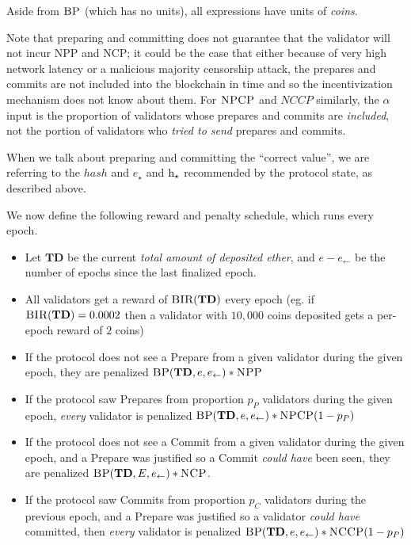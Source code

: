 \documentclass[12pt, final]{article}
\newcommand{\epoch}{\ensuremath{e}}
\newcommand{\hash}{\textnormal{h}}
\newcommand{\hashsource}{\hash_{\star}\xspace}
\newcommand{\epochsource}{\epoch_{\star}\xspace}
\newcommand{\BIR}{\textsc{BIR}\xspace}
\newcommand{\BP}{\textsc{BP}\xspace}
\newcommand{\NCP}{\textsc{NCP}\xspace}
\newcommand{\NCCP}{\textsc{NCCP}\xspace}
\newcommand{\NPP}{\textsc{NPP}\xspace}
\newcommand{\NPCP}{\textsc{NPCP}\xspace}
\newcommand{\totaldeposit}{ \textbf{TD} \xspace}
\newcommand{\LFE}{ \ensuremath{\epoch_{\leftarrow}} \xspace}
\begin{document}
Aside from $\BP$ (which has no units), all expressions have units of \emph{coins}.

Note that preparing and committing does not guarantee that the validator will not incur \NPP and \NCP; it could be the case that either because of very high network latency or a malicious majority censorship attack, the prepares and commits are not included into the blockchain in time and so the incentivization mechanism does not know about them. For $\NPCP$ and $NCCP$ similarly, the $\alpha$ input is the proportion of validators whose prepares and commits are \emph{included}, not the portion of validators who \emph{tried to send} prepares and commits. 

When we talk about preparing and committing the ``correct value'', we are referring to the $hash$ and $\epochsource$ and $\hashsource$ recommended by the protocol state, as described above.

We now define the following reward and penalty schedule, which runs every epoch.

\begin{itemize}
\item Let $\totaldeposit$ be the current \emph{total amount of deposited ether}, and $\epoch - \LFE$ be the number of epochs since the last finalized epoch.
\item All validators get a reward of $\BIR(\totaldeposit)$ every epoch (eg. if $\BIR(\totaldeposit) = 0.0002$ then a validator with $10,000$ coins deposited gets a per-epoch reward of $2$ coins)
\item If the protocol does not see a Prepare from a given validator during the given epoch, they are penalized $\BP(\totaldeposit, \epoch, \LFE) * \NPP$
\item If the protocol saw Prepares from proportion $p_P$ validators during the given epoch, \emph{every} validator is penalized $\BP(\totaldeposit, \epoch, \LFE) * \NPCP(1 - p_P)$
\item If the protocol does not see a Commit from a given validator during the given epoch, and a Prepare was justified so a Commit \emph{could have} been seen, they are penalized $\BP(\totaldeposit, E, \LFE) * \NCP$.
\item If the protocol saw Commits from proportion $p_C$ validators during the previous epoch, and a Prepare was justified so a validator \emph{could have} committed, then \emph{every} validator is penalized $\BP(\totaldeposit, \epoch, \LFE) * \NCCP(1 - p_P)$
\end{itemize}
\end{document}
